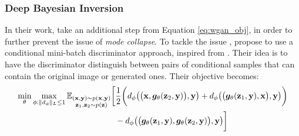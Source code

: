 \subsubsection{Deep Bayesian Inversion}
In their work, \citet{adler2018deep} take an additional step from Equation \ref{eq:wgan_obj}, in order to further prevent the issue of  \textit{mode collapse}. To tackle the issue \citet{adler2018deep}, propose to use a conditional mini-batch discriminator approach, inspired from \citet{karras2017progressive,salimans2016improved}. Their idea is to have the discriminator distinguish between pairs of conditional samples that can contain the original image or generated ones. Their objective becomes:
\begin{equation}
    \begin{split}
        \min_\theta \max_{\phi:\|d_\phi\|_L\leq 1} \mathbb{E}_{\substack{({\mathbf{x}},{\mathbf{y}}) \sim p({\mathbf{x}},{\mathbf{y}}) \\ {\mathbf{z}}_1, {\mathbf{z}}_2 \sim p({\mathbf{z}})}} \bigg[ &\frac{1}{2}\bigg(d_\phi\big(\big({\mathbf{x}},{\bm{g}}_\theta({\mathbf{z}}_2,{\mathbf{y}})\big),{\mathbf{y}}\big)+d_\phi\big(\big({\bm{g}}_\theta({\mathbf{z}}_1,{\mathbf{y}}),{\mathbf{x}}\big),{\mathbf{y}}\big)\bigg)\\
        &  - d_\phi\big(\big({\bm{g}}_\theta({\mathbf{z}}_1,{\mathbf{y}}),{\bm{g}}_\theta({\mathbf{z}}_2,{\mathbf{y}})\big),{\mathbf{y}}\big)\bigg]
    \end{split}
    \label{eq:ao_objective}
\end{equation}


